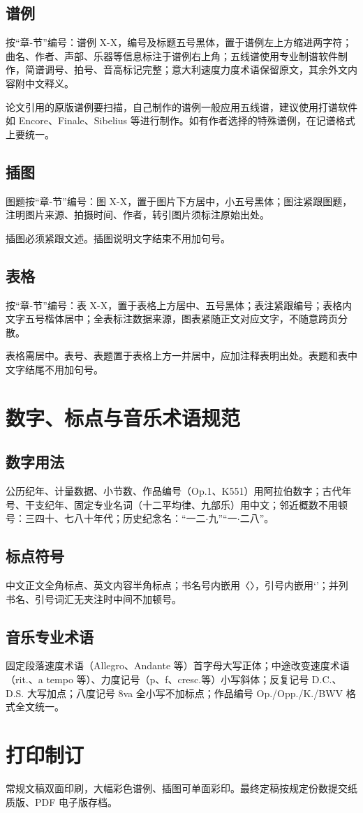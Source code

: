 \subsection{谱例}

按“章-节”编号：谱例 X-X，编号及标题五号黑体，置于谱例左上方缩进两字符；曲名、作者、声部、乐器等信息标注于谱例右上角；五线谱使用专业制谱软件制作，简谱调号、拍号、音高标记完整；意大利速度力度术语保留原文，其余外文内容附中文释义。

论文引用的原版谱例要扫描，自己制作的谱例一般应用五线谱，建议使用打谱软件如 Encore、Finale、Sibelius 等进行制作。如有作者选择的特殊谱例，在记谱格式上要统一。

\subsection{插图}

图题按“章-节”编号：图 X-X，置于图片下方居中，小五号黑体；图注紧跟图题，注明图片来源、拍摄时间、作者，转引图片须标注原始出处。

插图必须紧跟文述。插图说明文字结束不用加句号。

\subsection{表格}

按“章-节”编号：表 X-X，置于表格上方居中、五号黑体；表注紧跟编号；表格内文字五号楷体居中；全表标注数据来源，图表紧随正文对应文字，不随意跨页分散。

表格需居中。表号、表题置于表格上方一并居中，应加注释表明出处。表题和表中文字结尾不用加句号。

\section{数字、标点与音乐术语规范}

\subsection{数字用法}

公历纪年、计量数据、小节数、作品编号（Op.1、K551）用阿拉伯数字；古代年号、干支纪年、固定专业名词（十二平均律、九部乐）用中文；邻近概数不用顿号：三四十、七八十年代；历史纪念名：“一二$\cdot$九”“一$\cdot$二八”。

\subsection{标点符号}

中文正文全角标点、英文内容半角标点；书名号内嵌用〈〉，引号内嵌用‘’；并列书名、引号词汇无夹注时中间不加顿号。

\subsection{音乐专业术语}

固定段落速度术语（Allegro、Andante 等）首字母大写正体；中途改变速度术语（rit.、a tempo 等）、力度记号（p、f、cresc.等）小写斜体；反复记号 D.C.、D.S. 大写加点；八度记号 8va 全小写不加标点；作品编号 Op./Opp./K./BWV 格式全文统一。

\section{打印制订}

常规文稿双面印刷，大幅彩色谱例、插图可单面彩印。最终定稿按规定份数提交纸质版、PDF 电子版存档。

